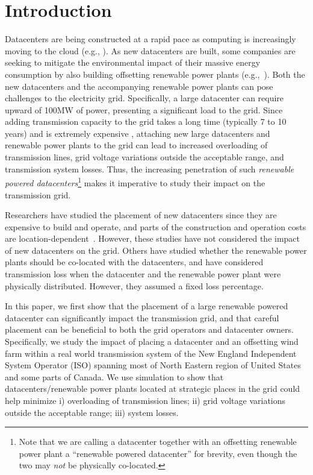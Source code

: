 \section{Introduction}
\label{sec:intro}

Datacenters are being constructed at a rapid pace as computing is increasingly moving to the cloud (e.g., \cite{RM14DCGrowth}).  As new datacenters are built, some companies are seeking to mitigate the environmental impact of their massive energy consumption by also building offsetting renewable power plants (e.g.,~\cite{GoogleGreen,Apple13,McGrawHill11}).  Both the new datacenters and the accompanying renewable power plants can pose challenges to the electricity grid.  Specifically, a large datacenter can require upward of 100MW of power, presenting a significant load to the grid.  Since adding transmission capacity to the grid takes a long time (typically 7 to 10 years) and is extremely expensive \cite{interconnection2010survey}, attaching new large datacenters and renewable power plants to the grid can lead to increased overloading of transmission lines, grid voltage variations outside the acceptable range, and transmission system losses.  Thus, the increasing penetration of such {\em renewable powered datacenters}\footnote{Note that we are calling a datacenter together with an offsetting renewable power plant a ``renewable powered datacenter'' for brevity, even though the two may {\em not} be physically co-located.} makes it imperative to study their impact on the transmission grid.

Researchers have studied the placement of new datacenters since they are expensive to build and operate, and parts of the construction and operation costs are location-dependent~\cite{Goiri11place,Dalger05,Boley09,larumbe2012optimal,berral2014building}.  However, these studies have not considered the impact of new datacenters on the grid.  Others have studied whether the renewable power plants should be co-located with the datacenters\cite{Ren12MASCOTS}, and have considered transmission loss when the datacenter and the renewable power plant were physically distributed.  However, they assumed a fixed loss percentage.

In this paper, we first show that the placement of a large renewable powered datacenter can significantly impact the transmission grid, and that careful placement can be beneficial to both the grid operators and datacenter owners.  Specifically, we study the impact of placing a datacenter and an offsetting wind farm within a real world transmission system of the New England Independent System Operator (ISO) spanning most of North Eastern region of United States and some parts of Canada.  We use simulation to show that datacenters/renewable power plants located at strategic places in the grid could help minimize i) overloading of transmission lines; ii) grid voltage variations outside the acceptable range; iii) system losses.
\IEEEpubidadjcol

